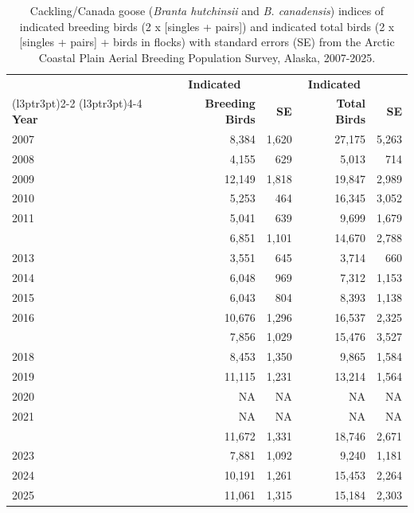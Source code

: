 \documentclass[
]{article}
\begin{document}
\begin{longtable}[t]{lrrrr}

\caption{\label{tbl-CCGO}Cackling/Canada goose (\emph{Branta hutchinsii}
and \emph{B. canadensis}) indices of indicated breeding birds (2 x
{[}singles + pairs{]}) and indicated total birds (2 x {[}singles +
pairs{]} + birds in flocks) with standard errors (SE) from the Arctic
Coastal Plain Aerial Breeding Population Survey, Alaska, 2007-2025.}

\tabularnewline

\\
\toprule
\multicolumn{1}{c}{\textbf{ }} & \multicolumn{1}{c}{\textbf{Indicated}} & \multicolumn{1}{c}{\textbf{ }} & \multicolumn{1}{c}{\textbf{Indicated}} & \multicolumn{1}{c}{\textbf{ }} \\
\cmidrule(l{3pt}r{3pt}){2-2} \cmidrule(l{3pt}r{3pt}){4-4}
\textbf{Year} & \textbf{Breeding Birds} & \textbf{SE} & \textbf{Total Birds} & \textbf{SE}\\
\midrule
2007 & 8,384 & 1,620 & 27,175 & 5,263\\
2008 & 4,155 & 629 & 5,013 & 714\\
2009 & 12,149 & 1,818 & 19,847 & 2,989\\
2010 & 5,253 & 464 & 16,345 & 3,052\\
2011 & 5,041 & 639 & 9,699 & 1,679\\
\addlinespace
2012 & 6,851 & 1,101 & 14,670 & 2,788\\
2013 & 3,551 & 645 & 3,714 & 660\\
2014 & 6,048 & 969 & 7,312 & 1,153\\
2015 & 6,043 & 804 & 8,393 & 1,138\\
2016 & 10,676 & 1,296 & 16,537 & 2,325\\
\addlinespace
2017 & 7,856 & 1,029 & 15,476 & 3,527\\
2018 & 8,453 & 1,350 & 9,865 & 1,584\\
2019 & 11,115 & 1,231 & 13,214 & 1,564\\
2020 & NA & NA & NA & NA\\
2021 & NA & NA & NA & NA\\
\addlinespace
2022 & 11,672 & 1,331 & 18,746 & 2,671\\
2023 & 7,881 & 1,092 & 9,240 & 1,181\\
2024 & 10,191 & 1,261 & 15,453 & 2,264\\
2025 & 11,061 & 1,315 & 15,184 & 2,303\\
\bottomrule

\end{longtable}
\end{document}
